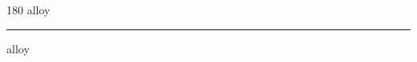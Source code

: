 
\begin{frame}
\begin{center}
\begin{turn}{180}
{\fontsize{2.5cm}{1em}\selectfont alloy}
\end{turn}
\vspace{1em}\par  
\hrule
\vspace{1em}\par  
{\fontsize{2.5cm}{1em}\selectfont alloy}
\end{center}
\end{frame}
